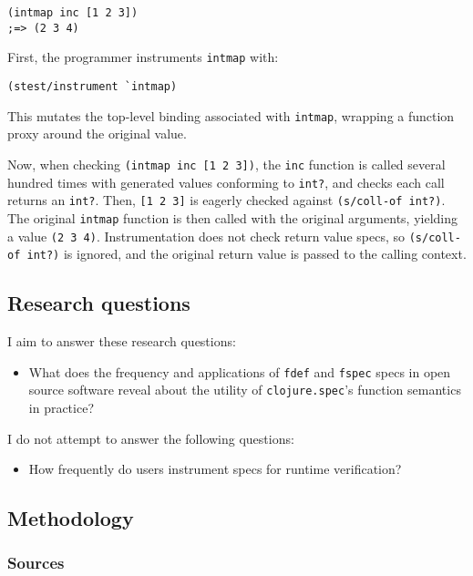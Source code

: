 \begin{verbatim}
(intmap inc [1 2 3])
;=> (2 3 4)
\end{verbatim}

First, the programmer instruments \texttt{intmap} with:

\begin{verbatim}
(stest/instrument `intmap)
\end{verbatim}

This mutates the top-level binding associated with \texttt{intmap}, wrapping a function
proxy around the original value.

Now, when checking \texttt{(intmap inc [1 2 3])}, the \texttt{inc} function is
called several hundred times with generated values conforming to \texttt{int?},
and checks each call returns an \texttt{int?}.
Then, \texttt{[1 2 3]} is eagerly checked against \texttt{(s/coll-of int?)}.
The original \texttt{intmap} function is then called with the original arguments,
yielding a value \texttt{(2 3 4)}. Instrumentation does not check return value specs,
so \texttt{(s/coll-of int?)} is ignored, and the original return value is passed to the calling
context.

\subsection{Research questions}

I aim to answer these research questions:

\begin{itemize}
  \item What does the frequency and applications of \texttt{fdef} and \texttt{fspec} specs
    in open source software reveal about the utility of \texttt{clojure.spec}'s
    function semantics in practice?
\end{itemize}

I do not attempt to answer the following questions:

\begin{itemize}
  \item How frequently do users instrument specs for runtime verification?
\end{itemize}

\subsection{Methodology}

\subsubsection{Sources}

